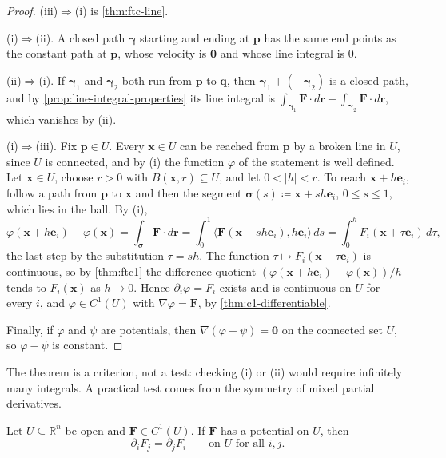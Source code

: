 \begin{proof}
(iii)$\Rightarrow$(i) is \cref{thm:ftc-line}.

(i)$\Rightarrow$(ii). A closed path $\boldsymbol\gamma$ starting and ending at $\mathbf p$ has the same end points as the constant path at $\mathbf p$, whose velocity is $\mathbf0$ and whose line integral is $0$.

(ii)$\Rightarrow$(i). If $\boldsymbol\gamma_1$ and $\boldsymbol\gamma_2$ both run from $\mathbf p$ to $\mathbf q$, then $\boldsymbol\gamma_1+(-\boldsymbol\gamma_2)$ is a closed path, and by \cref{prop:line-integral-properties} its line integral is $\int_{\boldsymbol\gamma_1}\mathbf F\cdot d\mathbf r-\int_{\boldsymbol\gamma_2}\mathbf F\cdot d\mathbf r$, which vanishes by (ii).

(i)$\Rightarrow$(iii). Fix $\mathbf p\in U$. Every $\mathbf x\in U$ can be reached from $\mathbf p$ by a broken line in $U$, since $U$ is connected, and by (i) the function $\varphi$ of the statement is well defined. Let $\mathbf x\in U$, choose $r>0$ with $B(\mathbf x,r)\subseteq U$, and let $0<|h|<r$. To reach $\mathbf x+h\mathbf e_i$, follow a path from $\mathbf p$ to $\mathbf x$ and then the segment $\boldsymbol\sigma(s)\coloneqq\mathbf x+sh\mathbf e_i$, $0\le s\le1$, which lies in the ball. By (i),
\[
\varphi(\mathbf x+h\mathbf e_i)-\varphi(\mathbf x)=\int_{\boldsymbol\sigma}\mathbf F\cdot d\mathbf r=\int_0^1\bigl\langle\mathbf F(\mathbf x+sh\mathbf e_i),h\mathbf e_i\bigr\rangle\,ds=\int_0^hF_i(\mathbf x+\tau\mathbf e_i)\,d\tau ,
\]
the last step by the substitution $\tau=sh$. The function $\tau\mapsto F_i(\mathbf x+\tau\mathbf e_i)$ is continuous, so by \cref{thm:ftc1} the difference quotient $(\varphi(\mathbf x+h\mathbf e_i)-\varphi(\mathbf x))/h$ tends to $F_i(\mathbf x)$ as $h\to0$. Hence $\partial_i\varphi=F_i$ exists and is continuous on $U$ for every $i$, and $\varphi\in C^1(U)$ with $\nabla\varphi=\mathbf F$, by \cref{thm:c1-differentiable}.

Finally, if $\varphi$ and $\psi$ are potentials, then $\nabla(\varphi-\psi)=\mathbf0$ on the connected set $U$, so $\varphi-\psi$ is constant.
\end{proof}

The theorem is a criterion, not a test: checking (i) or (ii) would require infinitely many integrals. A practical test comes from the symmetry of mixed partial derivatives.

\begin{proposition}
\label{prop:closed-condition}
Let $U\subseteq\mathbb R^n$ be open and $\mathbf F\in C^1(U)$. If $\mathbf F$ has a potential on $U$, then
\begin{equation}
\partial_iF_j=\partial_jF_i\qquad\text{on }U\text{ for all }i,j .
\label{eq:closed-condition}
\end{equation}
\end{proposition}

